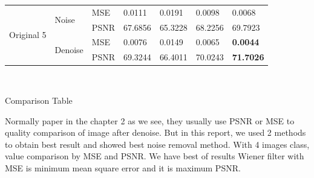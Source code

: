 \begin{center}
\begin{tabular}{llllllllllll|l|l|l|l|l|l|l|l|l|l|l|l|l|}
\multicolumn{4}{|l|}{\multirow{4}{*}{Original 5}} & \multicolumn{4}{l|}{\multirow{2}{*}{Noise}}   & \multicolumn{4}{l|}{MSE}  & \multicolumn{3}{l|}{0.0111}  & \multicolumn{3}{l|}{0.0191}  & \multicolumn{4}{l|}{0.0098}   & \multicolumn{3}{l|}{0.0068}           \\ \cline{9-25} 
\multicolumn{4}{|l|}{}                            & \multicolumn{4}{l|}{}                         & \multicolumn{4}{l|}{PSNR} & \multicolumn{3}{l|}{67.6856} & \multicolumn{3}{l|}{65.3228} & \multicolumn{4}{l|}{68.2256}  & \multicolumn{3}{l|}{69.7923}          \\ \cline{5-25} 
\multicolumn{4}{|l|}{}                            & \multicolumn{4}{l|}{\multirow{2}{*}{Denoise}} & \multicolumn{4}{l|}{MSE}  & \multicolumn{3}{l|}{0.0076}  & \multicolumn{3}{l|}{0.0149}  & \multicolumn{4}{l|}{0.0065}   & \multicolumn{3}{l|}{\textbf{0.0044}}  \\ \cline{9-25} 
\multicolumn{4}{|l|}{}                            & \multicolumn{4}{l|}{}                         & \multicolumn{4}{l|}{PSNR} & \multicolumn{3}{l|}{69.3244} & \multicolumn{3}{l|}{66.4011} & \multicolumn{4}{l|}{70.0243}  & \multicolumn{3}{l|}{\textbf{71.7026}} \\ \hline
\end{tabular}

\

Comparison Table
\end{center}
\vspace{1cm}

Normally paper in the chapter 2 as we see, they usually use PSNR or MSE to quality comparison of image after denoise. But in this report, we used 2 methods to obtain best result and showed best noise removal method. With 4 images class, value comparison by MSE and PSNR. We have best of results Wiener filter with MSE is minimum mean square error and it is maximum PSNR.









